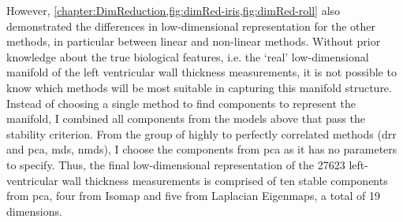 %
However, \cref{chapter:DimReduction,fig:dimRed-iris,fig:dimRed-roll} also demonstrated the differences in low-dimensional representation for the other methods, in particular between linear and non-linear methods. Without prior knowledge about the true biological features, i.e. the `real' low-dimensional manifold of the left ventricular wall thickness measurements, it is not possible to know which methods will be most suitable in capturing this manifold structure. 
Instead of choosing a single method to find components to represent the manifold, I combined all components from the models above that pass the stability criterion. From the group of highly to perfectly correlated methods (\gls{drr} and \gls{pca}, \gls{mds}, \gls{nmds}), I choose the components from \gls{pca} as it has no parameters to specify. Thus, the final low-dimensional representation of the \num{27623} left-ventricular wall thickness measurements is comprised of ten stable components from \gls{pca}, four from Isomap and five from Laplacian Eigenmaps, a total of \num{19} dimensions.



 


